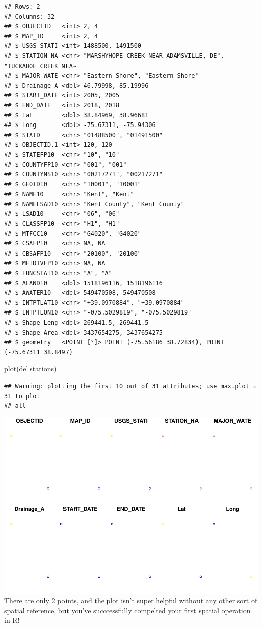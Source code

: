 \documentclass[]{article}
\newenvironment{Shaded}{\begin{snugshade}}{\end{snugshade}}
\newcommand{\FunctionTok}[1]{\textcolor[rgb]{0.00,0.00,0.00}{#1}}
\newcommand{\NormalTok}[1]{#1}
\begin{document}
\begin{verbatim}
## Rows: 2
## Columns: 32
## $ OBJECTID   <int> 2, 4
## $ MAP_ID     <int> 2, 4
## $ USGS_STATI <int> 1488500, 1491500
## $ STATION_NA <chr> "MARSHYHOPE CREEK NEAR ADAMSVILLE, DE", "TUCKAHOE CREEK NEA~
## $ MAJOR_WATE <chr> "Eastern Shore", "Eastern Shore"
## $ Drainage_A <dbl> 46.79998, 85.19996
## $ START_DATE <int> 2005, 2005
## $ END_DATE   <int> 2018, 2018
## $ Lat        <dbl> 38.84969, 38.96681
## $ Long       <dbl> -75.67311, -75.94306
## $ STAID      <chr> "01488500", "01491500"
## $ OBJECTID.1 <int> 120, 120
## $ STATEFP10  <chr> "10", "10"
## $ COUNTYFP10 <chr> "001", "001"
## $ COUNTYNS10 <chr> "00217271", "00217271"
## $ GEOID10    <chr> "10001", "10001"
## $ NAME10     <chr> "Kent", "Kent"
## $ NAMELSAD10 <chr> "Kent County", "Kent County"
## $ LSAD10     <chr> "06", "06"
## $ CLASSFP10  <chr> "H1", "H1"
## $ MTFCC10    <chr> "G4020", "G4020"
## $ CSAFP10    <chr> NA, NA
## $ CBSAFP10   <chr> "20100", "20100"
## $ METDIVFP10 <chr> NA, NA
## $ FUNCSTAT10 <chr> "A", "A"
## $ ALAND10    <dbl> 1518196116, 1518196116
## $ AWATER10   <dbl> 549470508, 549470508
## $ INTPTLAT10 <chr> "+39.0970884", "+39.0970884"
## $ INTPTLON10 <chr> "-075.5029819", "-075.5029819"
## $ Shape_Leng <dbl> 269441.5, 269441.5
## $ Shape_Area <dbl> 3437654275, 3437654275
## $ geometry   <POINT [°]> POINT (-75.56186 38.72834), POINT (-75.67311 38.8497)
\end{verbatim}

\begin{Shaded}
\begin{Highlighting}[]
\FunctionTok{plot}\NormalTok{(del.stations)}
\end{Highlighting}
\end{Shaded}

\begin{verbatim}
## Warning: plotting the first 10 out of 31 attributes; use max.plot = 31 to plot
## all
\end{verbatim}

\includegraphics{lab01_files/figure-latex/mypoints-1.pdf} There are only
2 points, and the plot isn't super helpful without any other sort of
spatial reference, but you've succcessfully compelted your first spatial
operation in R!
\end{document}
